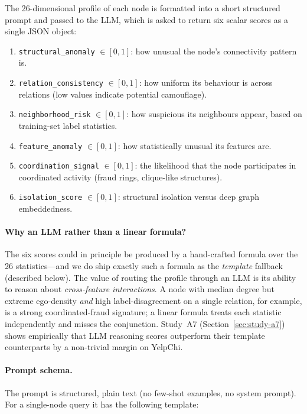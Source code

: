 The 26-dimensional profile of each node is formatted into a short structured prompt and passed to the LLM, which is asked to return six scalar scores as a single JSON object:

\begin{enumerate}
    \item \texttt{structural\_anomaly} $\in [0, 1]$: how unusual the node's connectivity pattern is.
    \item \texttt{relation\_consistency} $\in [0, 1]$: how uniform its behaviour is across relations (low values indicate potential camouflage).
    \item \texttt{neighborhood\_risk} $\in [0, 1]$: how suspicious its neighbours appear, based on training-set label statistics.
    \item \texttt{feature\_anomaly} $\in [0, 1]$: how statistically unusual its features are.
    \item \texttt{coordination\_signal} $\in [0, 1]$: the likelihood that the node participates in coordinated activity (fraud rings, clique-like structures).
    \item \texttt{isolation\_score} $\in [0, 1]$: structural isolation versus deep graph embeddedness.
\end{enumerate}

\paragraph{Why an LLM rather than a linear formula?} The six scores could in principle be produced by a hand-crafted formula over the 26 statistics---and we do ship exactly such a formula as the \emph{template} fallback (described below). The value of routing the profile through an LLM is its ability to reason about \emph{cross-feature interactions}. A node with median degree but extreme ego-density \emph{and} high label-disagreement on a single relation, for example, is a strong coordinated-fraud signature; a linear formula treats each statistic independently and misses the conjunction. Study~A7 (Section~\ref{sec:study-a7}) shows empirically that LLM reasoning scores outperform their template counterparts by a non-trivial margin on YelpChi.

\paragraph{Prompt schema.} The prompt is structured, plain text (no few-shot examples, no system prompt). For a single-node query it has the following template:

